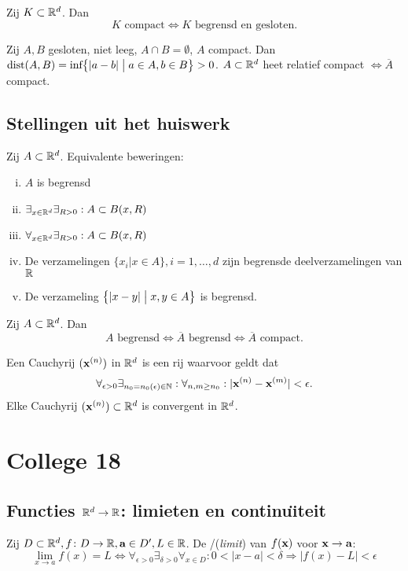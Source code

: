 \documentclass{2wa40summary}
\begin{document}
	Zij $K \subset \mathbb{R}^d$. Dan \[K \text{ compact}\Leftrightarrow K \text{ begrensd en gesloten.}\]
	
	\theorem Zij $A,B$ gesloten, niet leeg, $A\cap B = \emptyset$, $A$ compact.
	Dan $\text{dist}(A,B) = \text{inf}\big\{ |a-b| \bigm| a \in A, b \in B \big\} > 0$.
	 $A \subset \mathbb{R}^d$ heet relatief compact $\iff \overline{A}$ compact.
	
	\subsection{Stellingen uit het huiswerk}
	\theorem Zij $A \subset \mathbb{R}^d$. Equivalente beweringen:
	\begin{enumerate}[(i)]
		\item $A$ is begrensd
		\item $\exists _{x \in \mathbb{R}^d} \exists _{R>0}: A \subset B(x,R)$
		\item $\forall _{x \in \mathbb{R}^d} \exists _{R>0}: A \subset B(x,R)$
		\item De verzamelingen $\{ x_i | x \in A \}, i=1,\dots,d$ zijn begrensde deelverzamelingen van $\mathbb{R}$
		\item De verzameling $\big\{|x-y| \bigm| x,y \in A \big\}$ is begrensd.
	\end{enumerate}
	
	\theorem Zij $A \subset \mathbb{R}^d$. Dan \[A \text{ begrensd} \Leftrightarrow \overline{A} \text{ begrensd} \Leftrightarrow \overline{A}\text{ compact}.\]
	
	 Een Cauchyrij $({\textbf{x}}^{(n)})$ in $\mathbb{R}^d$ is een rij waarvoor geldt dat\[\forall _{\epsilon >0} \exists _{n_0=n_0(\epsilon )\in \naturals}:\forall _{n,m \geq n_0}: |\x\up{n}-\x\up{m}| < \epsilon.\]
	\theorem Elke Cauchyrij $({\textbf{x}}^{(n)})\subset\mathbb{R}^d$ is convergent in $\mathbb{R}^d$.
	
	\newpage
	\section{College 18}
	\subsection{Functies $\mathbb{R}^d \to \mathbb{R}$: limieten en continu\"{\i}teit}
	 Zij $D \subset \mathbb{R}^d, f\colon D\to \mathbb{R}, {\textbf{a}} \in D', L\in\mathbb{R}$.
	De /(\textit{limit}) van $f({\textbf{x}})$ voor ${\textbf{x}}\to{\textbf{a}}$:
	\[ \lim_{x\to a}f(x)=L \Leftrightarrow \forall _{\epsilon >0} \exists _{\delta >0} \forall _{x \in D}: 0<|x-a|<\delta \Rightarrow |f(x)-L|<\epsilon\]
	
\end{document}
